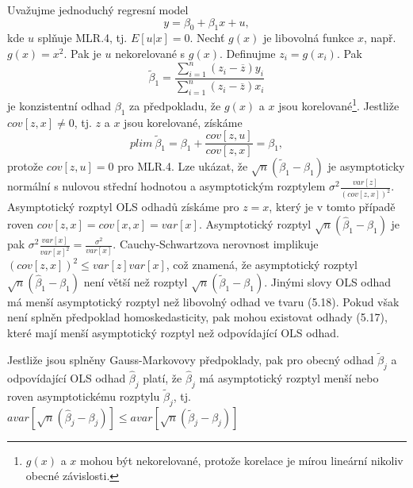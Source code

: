 Uvažujme jednoduchý regresní model
\begin{equation}
y = \beta_0 + \beta_1 x + u,
\end{equation}
kde $u$ splňuje MLR.4, tj. $E[u|x] = 0$. Nechť $g(x)$ je libovolná funkce $x$, např. $g(x) = x^2$. Pak je $u$ nekorelované s $g(x)$. Definujme 
$z_i = g(x_i)$. Pak
\begin{equation}
\tilde{\beta}_1 = \frac{\sum_{i = 1}^n(z_i - \overline{z})y_i}{\sum_{i = 1}^n (z_i - \overline{z})x_i}
\end{equation}
je konzistentní odhad $\beta_1$ za předpokladu, že $g(x)$ a $x$ jsou korelované\footnote{$g(x)$ a $x$ mohou být nekorelované, protože korelace 
je mírou lineární nikoliv obecné závislosti.}. Jestliže $cov[z, x] \ne 0$, tj. $z$ a $x$ jsou korelované, získáme
\begin{equation}
plim ~ \tilde{\beta}_1 = \beta_1 + \frac{cov[z, u]}{cov[z, x]} = \beta_1,
\end{equation}
protože $cov[z, u] = 0$ pro MLR.4. Lze ukázat, že $\sqrt{n}(\tilde{\beta}_1 - \beta_1)$ je asymptoticky normální s nulovou střední hodnotou a 
asymptotickým rozptylem $\sigma^2 \frac{var[z]}{(cov[z, x])^2}$. Asymptotický rozptyl OLS odhadů získáme pro $z = x$, který je v tomto 
případě roven $cov[z,x] = cov[x,x] = var[x]$. Asymptotický rozptyl $\sqrt{n}(\hat{\beta}_1 - \beta_1)$ je pak $\sigma^2 \frac{var[x]}{var[x]^2} = 
\frac{\sigma^2}{var[x]}$. Cauchy-Schwartzova nerovnost implikuje $(cov[z, x])^2 \le var[z]var[x]$, což znamená, že asymptotický rozptyl 
$\sqrt{n}(\hat{\beta}_1 - \beta_1)$ není větší než rozptyl $\sqrt{n}(\tilde{\beta}_1 - \beta_1)$. Jinými slovy OLS odhad má menší 
asymptotický rozptyl než libovolný odhad ve tvaru (5.18). Pokud však není splněn předpoklad homoskedasticity, pak mohou existovat odhady 
(5.17), které mají menší asymptotický rozptyl než odpovídající OLS odhad.

\begin{theorem}
Jestliže jsou splněny Gauss-Markovovy předpoklady, pak pro obecný odhad $\tilde{\beta}_j$ a odpovídající OLS odhad $\hat{\beta}_j$ platí, 
že $\hat{\beta}_j$ má asymptotický rozptyl menší nebo roven asymptotickému rozptylu $\tilde{\beta}_j$, tj. $avar[\sqrt{n}(\hat{\beta}_j - \beta_j)] \le avar[\sqrt{n}(\tilde{\beta}_j - \beta_j)]$

\raggedleft{$\clubsuit$}
\end{theorem}
